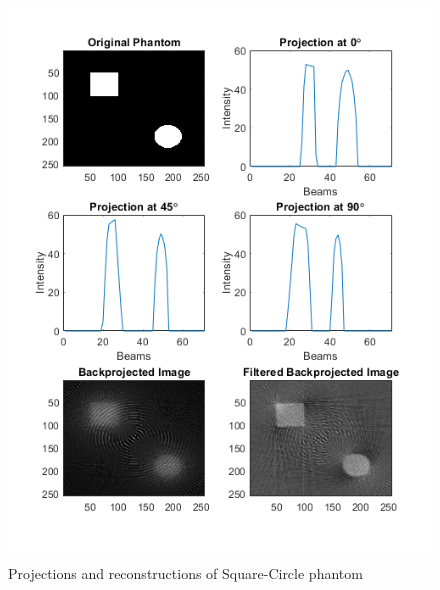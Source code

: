 \documentclass[journal]{IEEEtran}
\begin{document}
\begin{figure}[h]
	\centering
	\includegraphics[width=\columnwidth,height=.3\textheight]{images/sqcircprojected.png}
	\caption{Projections and reconstructions of Square-Circle phantom}\label{fig:sqcircprojected}
\end{figure}
\end{document}
